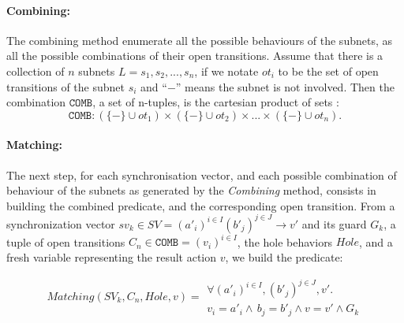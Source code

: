 \documentclass{lncs/llncs}
\begin{document}
%
%


\def\inactive{\{-\}}
\paragraph{Combining:}
The combining method enumerate all the possible behaviours of the
subnets, as all the possible combinations of their open transitions.
Assume that there is a collection of $n$ subnets $L = {s_1, s_2, ...,
  s_n}$, if we notate $ot_i$ to be the set of open transitions of the
subnet $s_i$ and ``$-$'' means the subnet is not involved.  
Then the combination $\texttt{COMB}$, a set of n-tuples, is the
cartesian product of sets :  
\[\texttt{COMB} : (\inactive\cup ot_1) \times (\inactive\cup ot_2)\times ... \times (\inactive\cup ot_n) .\]




\paragraph{Matching:}
The next step, for each synchronisation vector, and each possible
combination of behaviour of the subnets as generated by the \emph
{Combining} method, consists in building the combined predicate,
and the corresponding open transition.
From a synchronization vector
$sv_k\in SV = (a'_i)^{i\in I} (b'_j)^{j\in J}\rightarrow v'$
and its guard $G_k$, a tuple of open transitions
$C_n\in \texttt{COMB} = {(v_i)}^{i\in I}$, the hole behaviors $Hole$,
and a fresh variable representing the result action $v$, we build the
predicate: 

$$Matching(SV_k, C_n, Hole, v) = 
\begin{array}{l}
\forall {(a'_i)}^{i\in I},
{(b'_j)}^{j\in J},v'.
\\
v_i=a'_i\land \, b_j=b'_j \land v=v' \land G_k
\end{array}$$
\end{document}
